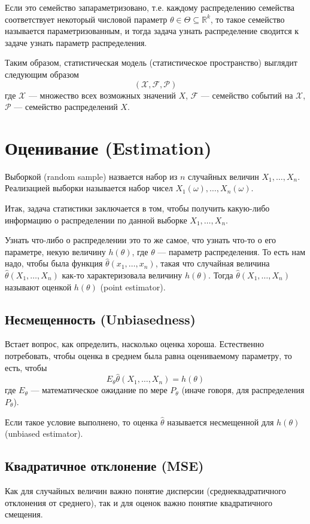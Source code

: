 \documentclass[a4paper,12pt]{article}
\newcommand{\thetah}{\hat\theta}
\newcommand{\R}{\mathbb{R}}
\newcounter{th-counter}
\begin{document}
Если это семейство запараметризовано, т.е. каждому распределению семейства соответствует некоторый числовой параметр $\theta \in \Theta \subseteq \R^k$, то такое семейство называется параметризованным, и тогда задача узнать распределение сводится к задаче узнать параметр распределения.

Таким образом, статистическая модель (статистическое пространство) выглядит следующим образом
$$(\mathcal{X}, \mathcal{F}, \mathcal{P})$$
где $\mathcal{X}$ --- множество всех возможных значений $X$, $\mathcal{F}$ --- семейство событий на $\mathcal{X}$, $\mathcal{P}$ --- семейство распределений $X$.

\section*{Оценивание (Estimation)} 
Выборкой (random sample) назвается набор из $n$ случайных величин $X_1, \ldots, X_n$. Реализацией выборки называется набор чисел $X_1(\omega), \ldots, X_n(\omega)$.

Итак, задача статистики заключается в том, чтобы получить какую-либо информацию о распределении по данной выборке $X_1, \ldots, X_n$.

Узнать что-либо о распределении это то же самое, что узнать что-то о его параметре, некую величину $h(\theta)$, где $\theta$ --- параметр распределения. То есть нам надо, чтобы была функция $\hat\theta(x_1, \ldots, x_n)$, такая что случайная величина $\hat\theta(X_1, \ldots, X_n)$ как-то характеризовала величину $h(\theta)$. Тогда $\hat\theta(X_1, \ldots, X_n)$ называют оценкой $h(\theta)$ (point estimator).

\subsection*{Несмещенность (Unbiasedness)} 
Встает вопрос, как определить, насколько оценка хороша. Естественно потребовать, чтобы оценка в среднем была равна оцениваемому параметру, то есть, чтобы
$$E_\theta \thetah (X_1, \ldots, X_n) = h(\theta)$$
где $E_\theta$ --- математическое ожидание по мере $P_\theta$ (иначе говоря, для распределения $P_\theta$).

Если такое условие выполнено, то оценка $\thetah$ называется несмещенной для $h(\theta)$ (unbiased estimator).

\subsection*{Квадратичное отклонение (MSE)} 
Как для случайных величин важно понятие дисперсии (среднеквадратичного отклонения от среднего), так и для оценок важно понятие квадратичного смещения.
\end{document}
